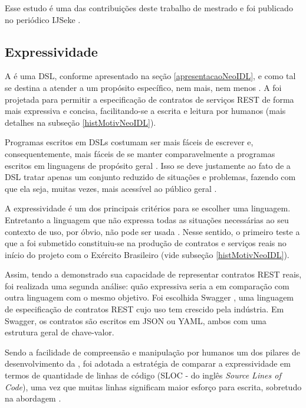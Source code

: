 Esse estudo é uma das contribuições deste trabalho de mestrado e foi publicado
no periódico IJSeke \cite{lima2015neoidl}.

\subsection{Expressividade}
\label{estudoExpressividadeNeoIDL}
\vspace{-6mm}

A \neoidl{} é uma DSL, conforme apresentado na seção \ref{apresentacaoNeoIDL},
e como tal se destina a atender a um propósito específico, nem mais, nem menos
\cite{hudak1998modular}. A \neoidl{} foi projetada para permitir a
especificação de contratos de serviços REST de forma mais expressiva e concisa,
facilitando-se a escrita e leitura por humanos (mais detalhes na subseção
\ref{histMotivNeoIDL}).

Programas escritos em DSLs costumam ser mais fáceis de escrever e,
consequentemente, mais fáceis de se manter comparavelmente a programas escritos
em linguagens de propósito geral \cite{hudak1998modular}. Isso se deve
justamente ao fato de a DSL tratar apenas um conjunto reduzido de situações e
problemas, fazendo com que ela seja, muitas vezes, mais acessível ao público
geral \cite{taha2008domain}.

A expressividade é um dos principais critérios para se escolher uma
linguagem. Entretanto a linguagem que não expressa todas as situações
necessárias ao seu contexto de uso, por óbvio, não pode ser usada
\cite{mackinlay1985expressiveness}. Nesse sentido, o primeiro teste a que a
\neoidl{} foi submetido constituiu-se na produção de contratos e serviços reais
no início do projeto com o Exército Brasileiro (vide subseção \ref{histMotivNeoIDL}).

Assim, tendo a \neoidl{} demonstrado sua capacidade de representar contratos
REST reais, foi realizada uma segunda análise: quão expressiva seria a
\neoidl{} em comparação com outra linguagem com o mesmo objetivo. Foi escolhida
Swagger \cite{swaggerSite}, uma linguagem de especificação de contratos REST
cujo uso tem crescido pela indústria.
Em Swagger, os contratos são escritos em JSON\cite{JSon} ou YAML\cite{YAML},
ambos com uma estrutura geral de chave-valor.

Sendo a facilidade de compreensão e manipulação por humanos um dos pilares
de desenvolvimento da \neoidl{}, foi adotada a estratégia de comparar a
expressividade em termos de quantidade de linhas de código (SLOC - do inglês
\textit{Source Lines of Code}), uma vez que muitas linhas significam maior
esforço para escrita, sobretudo na abordagem \CtFirst{}.

